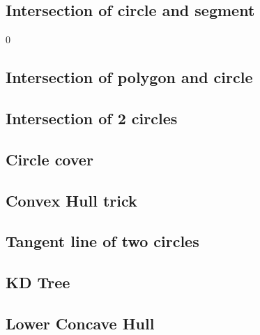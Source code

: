 \documentclass[a4paper,10pt,twocolumn,oneside]{article}
\begin{document}
\subsection{Intersection of circle and segment}0


\subsection{Intersection of polygon and circle}


\subsection{Intersection of 2 circles}
\subsection{Circle cover}


%

\subsection{Convex Hull trick}


\subsection{Tangent line of two circles}


\subsection{KD Tree}
%


%

\subsection{Lower Concave Hull}

\end{document}
